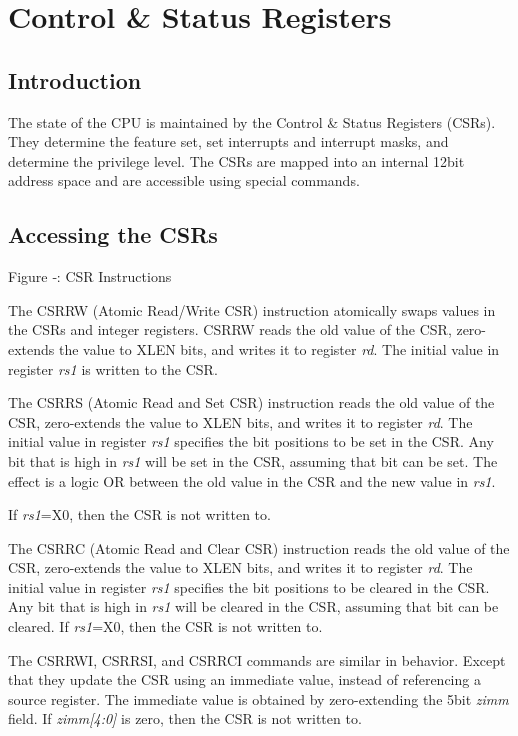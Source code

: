 \section{Control \& Status Registers}\label{control-status-registers}

\subsection{Introduction}\label{introduction-3}

The state of the CPU is maintained by the Control \& Status Registers
(CSRs). They determine the feature set, set interrupts and interrupt
masks, and determine the privilege level. The CSRs are mapped into an
internal 12bit address space and are accessible using special commands.

\subsection{Accessing the CSRs}\label{accessing-the-csrs}

\missingfigure{}

Figure ‑: CSR Instructions

The CSRRW (Atomic Read/Write CSR) instruction atomically swaps values in
the CSRs and integer registers. CSRRW reads the old value of the CSR,
zero-extends the value to XLEN bits, and writes it to register
\emph{rd}. The initial value in register \emph{rs1} is written to the
CSR.

The CSRRS (Atomic Read and Set CSR) instruction reads the old value of
the CSR, zero-extends the value to XLEN bits, and writes it to register
\emph{rd}. The initial value in register \emph{rs1} specifies the bit
positions to be set in the CSR. Any bit that is high in \emph{rs1} will
be set in the CSR, assuming that bit can be set. The effect is a logic
OR between the old value in the CSR and the new value in \emph{rs1}.

If \emph{rs1}=X0, then the CSR is not written to.

The CSRRC (Atomic Read and Clear CSR) instruction reads the old value of
the CSR, zero-extends the value to XLEN bits, and writes it to register
\emph{rd}. The initial value in register \emph{rs1} specifies the bit
positions to be cleared in the CSR. Any bit that is high in \emph{rs1}
will be cleared in the CSR, assuming that bit can be cleared. If
\emph{rs1}=X0, then the CSR is not written to.

The CSRRWI, CSRRSI, and CSRRCI commands are similar in behavior. Except
that they update the CSR using an immediate value, instead of
referencing a source register. The immediate value is obtained by
zero-extending the 5bit \emph{zimm} field. If \emph{zimm{[}4:0{]}} is
zero, then the CSR is not written to.

